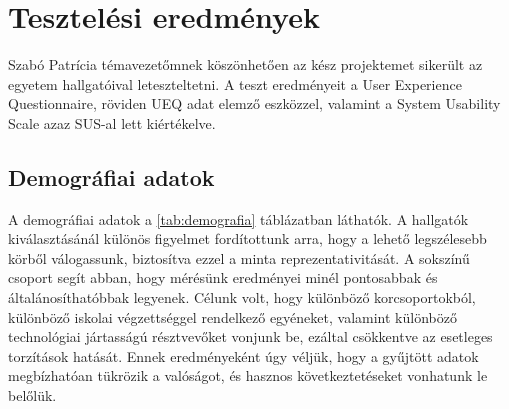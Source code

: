 \chapter{Tesztelési eredmények}

\thispagestyle{fancy}
\pagestyle{fancy}

Szabó Patrícia témavezetőmnek köszönhetően az kész projektemet sikerült az egyetem hallgatóival leteszteltetni.
A teszt eredményeit a User Experience Questionnaire, röviden UEQ adat elemző eszközzel, valamint a System Usability Scale azaz SUS-al lett kiértékelve. 
 
\section{Demográfiai adatok}
A demográfiai adatok a \ref{tab:demografia} táblázatban láthatók. A hallgatók kiválasztásánál különös figyelmet fordítottunk arra, hogy a lehető legszélesebb körből válogassunk, biztosítva ezzel a minta reprezentativitását. A sokszínű csoport segít abban, hogy mérésünk eredményei minél pontosabbak és általánosíthatóbbak legyenek. Célunk volt, hogy különböző korcsoportokból, különböző iskolai végzettséggel rendelkező egyéneket, valamint különböző technológiai jártasságú résztvevőket vonjunk be, ezáltal csökkentve az esetleges torzítások hatását. Ennek eredményeként úgy véljük, hogy a gyűjtött adatok megbízhatóan tükrözik a valóságot, és hasznos következtetéseket vonhatunk le belőlük.

